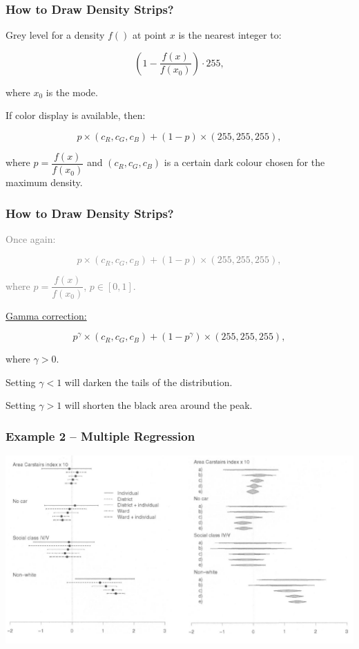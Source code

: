 \documentclass[11pt,usenames,dvipsnames,svgnames,x11names]{beamer}
\theoremstyle{plain}
\theoremstyle{definition}
\theoremstyle{remark}
\begin{document}
\begin{frame}
	\frametitle{How to Draw Density Strips?}
	
	Grey level for a density $f()$ at point $x$ is the nearest integer to:
	
	$$ \left(1-\dfrac{f(x)}{f(x_0)}\right)\cdot 255, $$
	
	where $x_0$ is the mode.
	
	\bigskip
	
	If color display is available, then:
	
	$$ p\times (c_R, c_G, c_B) + (1-p)\times(255,255,255), $$

	where $p=\dfrac{f(x)}{f(x_0)}$ and $(c_R, c_G, c_B)$ is a certain dark colour chosen for the maximum density.
	
\end{frame}

\begin{frame}
	\frametitle{How to Draw Density Strips?}
	

	\textcolor{gray}{Once again:}
	
	\textcolor{gray}{$$ p\times (c_R, c_G, c_B) + (1-p)\times(255,255,255), $$}

	\textcolor{gray}{where $p=\dfrac{f(x)}{f(x_0)}$, $p\in[0,1].$}
	
	\bigskip
	
	\underline{Gamma correction:}
	
	$$ p^\gamma\times (c_R, c_G, c_B) + (1-p^\gamma)\times(255,255,255), $$	
	
	where $\gamma>0$.
	
	\bigskip
	
	Setting $\gamma<1$ will darken the tails of the distribution.
	
	\bigskip
	
	Setting $\gamma>1$ will shorten the black area around the peak.	
		
	
\end{frame}

\begin{frame}
	\frametitle{Example 2 -- Multiple Regression}
	\centering
	\includegraphics[width=\textwidth]{ee.png}
\end{frame}
\end{document}
